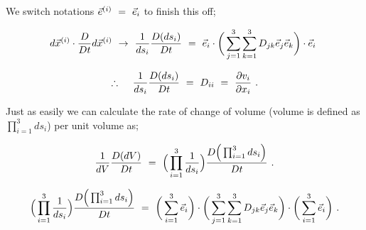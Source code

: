 \documentclass{article}
\begin{document}
We switch notations \begin{math} \vec{e}^{(i)} \hspace{0.125cm} = \hspace{0.125cm} \vec{e}_i \end{math} to finish this off;

\begin{equation} \label{eb-eq-1-118}
d \vec{x}^{(i)} \cdot \frac{D}{D t} d \vec{x}^{(i)} \hspace{0.125cm} \rightarrow \hspace{0.125cm} \frac{1}{ds_i} \frac{D ( ds_i )}{D t} \hspace{0.125cm} = \hspace{0.125cm}  \vec{e}_i \cdot \bigg( \sum_{j = 1}^{3} \sum_{k = 1}^{3} D_{j k} \vec{e}_j \vec{e}_k \bigg) \cdot \vec{e}_i \hspace{0.125cm} 
\end{equation} 

\begin{equation} \label{eb-eq-1-119}
\therefore \hspace{0.425cm} \frac{1}{ds_i} \frac{D ( ds_i )}{D t} \hspace{0.125cm} = \hspace{0.125cm} D_{i i} \hspace{0.125cm} = \hspace{0.125cm} \frac{\partial{v_i}}{\partial{x_i}} \hspace{0.125cm} . 
\end{equation} 

Just as easily we can calculate the rate of change of volume (volume is defined as \begin{math} \prod_{i = 1}^{3} ds_i \end{math}) per unit volume as;

\begin{equation} \label{eb-eq-1-120}
\frac{1}{dV} \frac{D ( dV )}{D t} \hspace{0.125cm} = \hspace{0.125cm} \Big( \prod_{i = 1}^{3} \frac{1}{ds_i} \Big) \frac{D \Big( \prod_{i = 1}^{3} ds_i \Big)}{D t} \hspace{0.125cm} . 
\end{equation} 

\begin{equation} \label{eb-eq-1-121}
\Big( \prod_{i = 1}^{3} \frac{1}{ds_i} \Big) \frac{D \Big( \prod_{i = 1}^{3} ds_i \Big)}{D t} \hspace{0.125cm} = \hspace{0.125cm} \bigg( \sum_{i = 1}^{3} \vec{e}_i \bigg) \cdot \bigg( \sum_{j = 1}^{3} \sum_{k = 1}^{3} D_{j k} \vec{e}_j \vec{e}_k \bigg) \cdot \bigg( \sum_{i = 1}^{3} \vec{e}_i \bigg) \hspace{0.125cm} . 
\end{equation} 
\end{document}
